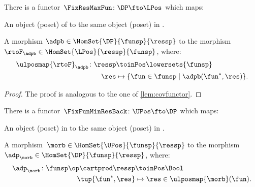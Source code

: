 \begin{lemma}
\label{lem:confunctor}
There is a functor~$\FixResMaxFun\colon \DP \fto \LPos$ which maps:
\begin{compactenum}
\item An object (poset) of \DP to the same object (poset) in \LPos.
\item A morphism $\adpb \in \HomSet{\DP}{\funsp}{\ressp}$ to the morphism~$\rtoF_\adpb\in \HomSet{\LPos}{\ressp}{\funsp}$, where:
\begin{equation*}
\begin{aligned}
\ulposmap{\rtoF}_\adpb\colon \ressp &\toinPos \lowersets{\funsp}\\
\res&\mapsto \{ \fun \in \funsp \mid \adpb(\fun^*,\res)\}.
\end{aligned}
\end{equation*}
\end{compactenum}
\end{lemma}

\begin{proof}
The proof is analogous to the one of \cref{lem:covfunctor}.
\end{proof}


\begin{lemma}
\label{lem:covfunctorback}
There is a functor~$\FixFunMinResBack\colon \UPos \fto \DP$ which maps:
\begin{compactenum}
\item An object (poset) in \UPos to the same object (poset) in \DP.
\item A morphism~$\morb\in \HomSet{\UPos}{\funsp}{\ressp}$ to the morphism~$\adp_\morb \in \HomSet{\DP}{\funsp}{\ressp}$, where:
\begin{equation}
\begin{aligned}
\adp_\morb\colon \funsp\op \cartprod \ressp &\toinPos \Bool\\
\tup{\fun^*,\res}&\mapsto \res \in \ulposmap{\morb}(\fun).
\end{aligned}
\end{equation}
\end{compactenum}
\end{lemma}

